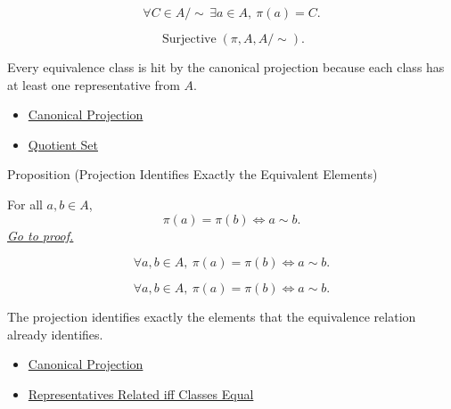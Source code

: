 \begin{remark*}
\[
\forall C\in A/{\sim}\,\exists a\in A,\ \pi(a)=C.
\]
\end{remark*}

\begin{remark*}
\[
\operatorname{Surjective}(\pi,A,A/{\sim}).
\]
\end{remark*}

\begin{remark*}[Interpretation]
Every equivalence class is hit by the canonical projection because each class
has at least one representative from $A$.
\end{remark*}

\begin{dependencies}
\begin{itemize}
  \item \hyperref[def:canonical-projection]{Canonical Projection}
  \item \hyperref[def:quotient-set]{Quotient Set}
\end{itemize}
\end{dependencies}

\begin{propositionbox}{Proposition (Projection Identifies Exactly the Equivalent Elements)}
\begin{proposition}
\label{prop:projection-identifies-equivalent-elements}
For all $a,b\in A$,
\[
\pi(a)=\pi(b)\Longleftrightarrow a\sim b.
\]
\hyperref[prf:projection-identifies-equivalent-elements]{\textit{Go to proof.}}
\end{proposition}
\end{propositionbox}

\begin{remark*}
\[
\forall a,b\in A,\ \pi(a)=\pi(b)\Longleftrightarrow a\sim b.
\]
\end{remark*}

\begin{remark*}
\[
\forall a,b\in A,\ \pi(a)=\pi(b)\Longleftrightarrow a\sim b.
\]
\end{remark*}

\begin{remark*}[Interpretation]
The projection identifies exactly the elements that the equivalence relation
already identifies.
\end{remark*}

\begin{dependencies}
\begin{itemize}
  \item \hyperref[def:canonical-projection]{Canonical Projection}
  \item \hyperref[prop:representatives-related-iff-classes-equal]{Representatives Related iff Classes Equal}
\end{itemize}
\end{dependencies}

